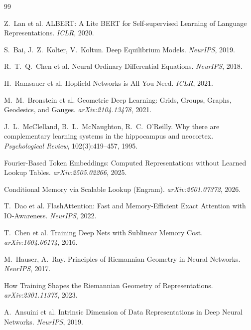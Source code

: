 \documentclass[11pt, a4paper]{article}
\theoremstyle{remark}
\begin{document}
\begin{thebibliography}{99}

Z.~Lan et al. ALBERT: A Lite BERT for Self-supervised Learning of Language Representations. \emph{ICLR}, 2020.

S.~Bai, J.~Z.~Kolter, V.~Koltun. Deep Equilibrium Models. \emph{NeurIPS}, 2019.

R.~T.~Q.~Chen et al. Neural Ordinary Differential Equations. \emph{NeurIPS}, 2018.

H.~Ramsauer et al. Hopfield Networks is All You Need. \emph{ICLR}, 2021.

M.~M.~Bronstein et al. Geometric Deep Learning: Grids, Groups, Graphs, Geodesics, and Gauges. \emph{arXiv:2104.13478}, 2021.

J.~L.~McClelland, B.~L.~McNaughton, R.~C.~O'Reilly. Why there are complementary learning systems in the hippocampus and neocortex. \emph{Psychological Review}, 102(3):419--457, 1995.

Fourier-Based Token Embeddings: Computed Representations without Learned Lookup Tables. \emph{arXiv:2505.02266}, 2025.

Conditional Memory via Scalable Lookup (Engram). \emph{arXiv:2601.07372}, 2026.

T.~Dao et al. FlashAttention: Fast and Memory-Efficient Exact Attention with IO-Awareness. \emph{NeurIPS}, 2022.

T.~Chen et al. Training Deep Nets with Sublinear Memory Cost. \emph{arXiv:1604.06174}, 2016.

M.~Hauser, A.~Ray. Principles of Riemannian Geometry in Neural Networks. \emph{NeurIPS}, 2017.

How Training Shapes the Riemannian Geometry of Representations. \emph{arXiv:2301.11375}, 2023.

A.~Ansuini et al. Intrinsic Dimension of Data Representations in Deep Neural Networks. \emph{NeurIPS}, 2019.


\end{thebibliography}
\end{document}
